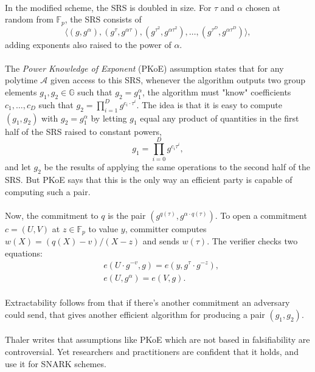\documentclass[11pt]{article}
\newcommand{\group}{\mathbb{G}}
\begin{document}
\paragraph{} In the modified scheme, the SRS is doubled in size. For $\tau$ and $\alpha$ chosen at random from $\mathbb{F}_p$, the SRS consists of
\[ \langle (g, g^\alpha), (g^\tau, g^{\alpha \tau}), (g^{\tau^2}, g^{\alpha \tau^2}), \ldots, (g^{\tau^D}, g^{\alpha \tau^D}) \rangle, \] adding exponents also raised to the power of $\alpha$.

\paragraph{} The \textit{Power Knowledge of Exponent} (PKoE) assumption states that for any polytime $\mathcal{A}$ given access to this SRS, whenever the algorithm outputs two group elements $g_1, g_2 \in \group$ such that $g_2 = g_1^\alpha$, the algorithm must "know" coefficients $c_1, \ldots, c_D$ such that $g_2 = \prod_{i = 1}^D g^{c_i \cdot \tau^i}$. The idea is that it is easy to compute $(g_1, g_2)$ with $g_2 = g_1^\alpha$ by letting $g_1$ equal any product of quantities in the first half of the SRS raised to constant powers,
\[ g_1 = \prod_{i = 0}^D g^{c_i \tau^i}, \]
and let $g_2$ be the results of applying the same operations to the second half of the SRS. But PKoE says that this is the only way an efficient party is capable of computing such a pair.

\paragraph{} Now, the commitment to $q$ is the pair $(g^{q(\tau)}, g^{\alpha \cdot q(\tau)})$. To open a commitment $c = (U, V)$ at $z \in \mathbb{F}_p$ to value $y$, committer computes $w(X) = (q(X) -  v) / (X - z)$ and sends $w(\tau)$. The verifier checks two equations:
\begin{align*}
    &e(U \cdot g^{-v}, g) = e(y, g^\tau \cdot g^{-z}), \\
    &e(U, g^\alpha) = e(V, g).
\end{align*}

\paragraph{} Extractability follows from that if there's another commitment an adversary could send, that gives another efficient algorithm for producing a pair $(g_1, g_2)$.

\paragraph{} Thaler writes that assumptions like PKoE which are not based in falsifiability are controversial. Yet researchers and practitioners are confident that it holds, and use it for SNARK schemes.



\end{document}
